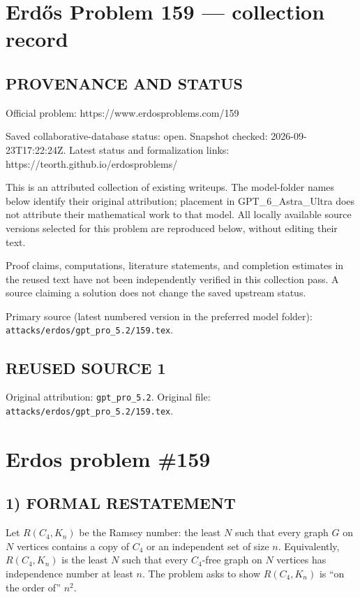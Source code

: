 \section*{Erd\H{o}s Problem 159 --- collection record}

\subsection*{PROVENANCE AND STATUS}
Official problem: https://www.erdosproblems.com/159

Saved collaborative-database status: open.
Snapshot checked: 2026-09-23T17:22:24Z.
Latest status and formalization links: https://teorth.github.io/erdosproblems/

This is an attributed collection of existing writeups. The model-folder names below identify their original attribution; placement in GPT\_6\_Astra\_Ultra does not attribute their mathematical work to that model. All locally available source versions selected for this problem are reproduced below, without editing their text.

Proof claims, computations, literature statements, and completion estimates in the reused text have not been independently verified in this collection pass. A source claiming a solution does not change the saved upstream status.

Primary source (latest numbered version in the preferred model folder): \texttt{attacks/erdos/gpt\_pro\_5.2/159.tex}.

\subsection*{REUSED SOURCE 1}
Original attribution: \texttt{gpt\_pro\_5.2}.
Original file: \texttt{attacks/erdos/gpt\_pro\_5.2/159.tex}.

\section*{Erdos problem \#159}

\subsection*{1) FORMAL RESTATEMENT}
Let $R(C_4,K_n)$ be the Ramsey number: the least $N$ such that every graph $G$ on $N$ vertices contains a copy of $C_4$ or an independent set of size $n$.
Equivalently, $R(C_4,K_n)$ is the least $N$ such that every $C_4$-free graph on $N$ vertices has independence number at least $n$.
The problem asks to show $R(C_4,K_n)$ is ``on the order of'' $n^2$.

